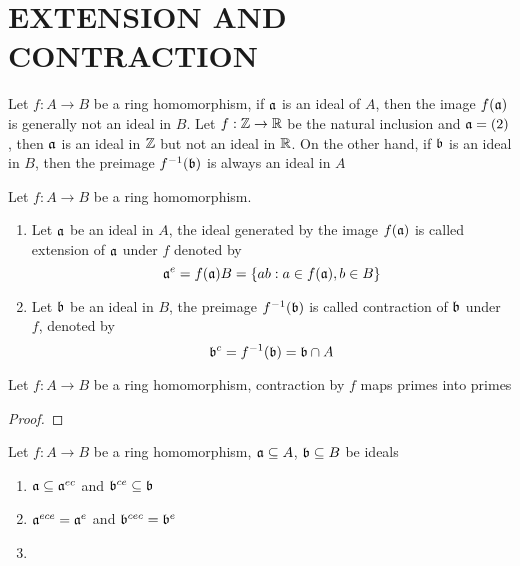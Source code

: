 \section{EXTENSION AND CONTRACTION}

Let $f: A \to B$ be a ring homomorphism, if $\mathfrak{a}$ is an ideal of $A$, then the image $f(\mathfrak{a})$ is generally not an ideal in $B$. Let $f: \mathbb{Z} \to \mathbb{R}$ be the natural inclusion and $\mathfrak{a} = (2)$, then $\mathfrak{a}$ is an ideal in $\mathbb{Z}$ but not an ideal in $\mathbb{R}$. On the other hand, if $\mathfrak{b}$ is an ideal in $B$, then the preimage $f^{-1}(\mathfrak{b})$ is always an ideal in $A$

\begin{definition}
	Let $f: A \to B$ be a ring homomorphism.
	\begin{enumerate}
		\item Let $\mathfrak{a}$ be an ideal in $A$, the ideal generated by the image $f(\mathfrak{a})$ is called extension of $\mathfrak{a}$ under $f$ denoted by
		$$
			\mathfrak{a}^e = f(\mathfrak{a}) B = \{ab: a \in f(\mathfrak{a}), b \in B \}
		$$
		
		\item Let $\mathfrak{b}$ be an ideal in $B$, the preimage $f^{-1}(\mathfrak{b})$ is called contraction of $\mathfrak{b}$ under $f$, denoted by
		$$
			\mathfrak{b}^c = f^{-1}(\mathfrak{b}) = \mathfrak{b} \cap A
		$$
	\end{enumerate}
\end{definition}

\begin{proposition}
	Let $f: A \to B$ be a ring homomorphism, contraction by $f$ maps  primes into primes
\end{proposition}

\begin{proof}
\end{proof}

\begin{proposition}
	Let $f: A \to B$ be a ring homomorphism, $\mathfrak{a} \subseteq A$, $\mathfrak{b} \subseteq B$ be ideals
	\begin{enumerate}
		\item $\mathfrak{a} \subseteq \mathfrak{a}^{ec}$ and $\mathfrak{b}^{ce} \subseteq \mathfrak{b}$
		\item $\mathfrak{a}^{ece} = \mathfrak{a}^e$ and $\mathfrak{b}^{cec} = \mathfrak{b}^e$
		\item {}
	\end{enumerate}
\end{proposition}

\begin{longproof}
\end{longproof}

